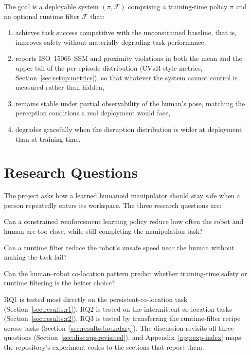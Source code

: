 \documentclass[11pt,a4paper]{report}
\newcommand{\ssm}{SSM}
\newcommand{\iso}{ISO~15066}
\newcommand{\cvar}{\ensuremath{\mathrm{CVaR}}}
\begin{document}
The goal is a deployable system $(\pi, \mathcal{F})$ comprising a
training-time policy $\pi$ and an optional runtime filter
$\mathcal{F}$ that:
\begin{enumerate}[topsep=2pt,itemsep=1pt]
\item achieves task success competitive with the unconstrained
  baseline, that is, improves safety without materially degrading
  task performance,
\item reports \iso{}~\ssm{} and proximity violations in both the mean
  and the upper tail of the per-episode distribution
  (\cvar{}-style metrics, Section~\ref{sec:setup:metrics}), so that
  whatever the system cannot control is measured rather than hidden,
\item remains stable under partial observability of the human's pose,
  matching the perception conditions a real deployment would face,
\item degrades gracefully when the disruption distribution is wider
  at deployment than at training time.
\end{enumerate}

\section{Research Questions}
\label{sec:intro:rqs}

The project asks how a learned humanoid manipulator should stay safe
when a person repeatedly enters its workspace. The three research
questions are:

\begin{description}[leftmargin=2em,style=nextline]
\item[RQ1: Training-time safety] Can a constrained reinforcement
  learning policy reduce how often the robot and human are too close,
  while still completing the manipulation task?
\item[RQ2: Runtime safety] Can a runtime filter reduce the robot's
  unsafe speed near the human without making the task fail?
\item[RQ3: Choosing between them] Can the human--robot co-location
  pattern predict whether training-time safety or runtime filtering is
  the better choice?
\end{description}

RQ1 is tested most directly on the persistent-co-location task
(Section~\ref{sec:results:r1}). RQ2 is tested on the
intermittent-co-location tasks (Section~\ref{sec:results:r2}). RQ3 is
tested by transferring the runtime-filter recipe across tasks
(Section~\ref{sec:results:boundary}). The discussion revisits all
three questions (Section~\ref{sec:disc:rqs-revisited}), and
Appendix~\ref{app:exp-index} maps the repository's experiment codes to
the sections that report them.
\end{document}
